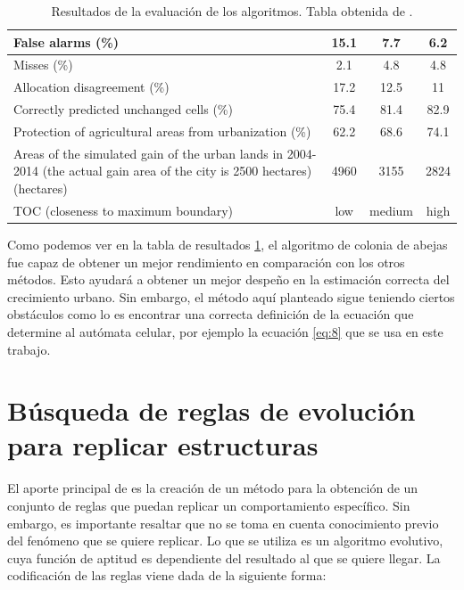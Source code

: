 \begin{table}[H]
	\begin{center}
		\begin{tabular}{p{5.8cm} c c c}
		{\small False alarms (\%)}&{\small 15.1}&{\small 7.7}&{\small 6.2 } \\
		\hline
		{\small Misses (\%)}&{\small 2.1}&{\small 4.8}&{\small 4.8 } \\
		\hline
		{\small Allocation disagreement (\%)}&{\small 17.2}&{\small 12.5}&{\small 11 } \\
		\hline
		{\small Correctly predicted unchanged cells (\%)}&{\small 75.4}&{\small 81.4}&{\small 82.9 } \\
		\hline
		{\small Protection of agricultural areas from urbanization (\%)}&{\small 62.2}&{\small 68.6}&{\small 74.1 } \\
		\hline
		{\small Areas of the simulated gain of the urban lands in 2004-2014 (the actual gain area of the city is 2500 hectares) (hectares)}&{\small 4960}&{\small 3155}&{\small 2824 } \\
		\hline
		{\small TOC (closeness to maximum boundary)}&{\small low}&{\small medium}&{\small high } \\
		\hline
		\end{tabular}
	\end{center}
	\caption{Resultados de la evaluación de los algoritmos. Tabla obtenida de \cite{naghibi2016discovery}. }
	\label{fig:results}
\end{table}

Como podemos ver en la tabla de resultados \ref{fig:results}, el algoritmo de colonia de abejas fue capaz de obtener un mejor rendimiento en comparación con los otros métodos. Esto ayudará a obtener un mejor despeño en la estimación correcta del crecimiento urbano. Sin embargo, el método aquí planteado sigue teniendo ciertos obstáculos como lo es encontrar una correcta definición de la ecuación que determine al autómata celular, por ejemplo la ecuación \ref{eq:8} que se usa en este trabajo. 


\section{Búsqueda de reglas de evolución para replicar estructuras}

El aporte principal de \cite{bidlo2016routine} es la creación de un método para la obtención de un conjunto de reglas que puedan replicar un comportamiento específico. Sin embargo, es importante resaltar que no se toma en cuenta conocimiento previo del fenómeno que se quiere replicar. Lo que se utiliza es un algoritmo evolutivo, cuya función de aptitud es dependiente del resultado al que se quiere llegar. La codificación de las reglas viene dada de la siguiente forma:

